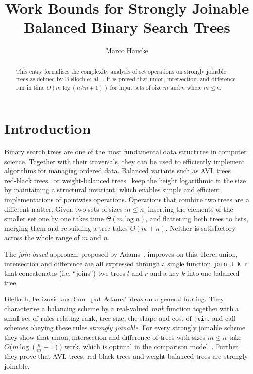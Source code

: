 \documentclass[11pt,a4paper]{article}
\begin{document}
\title{Work Bounds for Strongly Joinable Balanced Binary Search Trees}
\author{Marco Haucke}
\maketitle

\begin{abstract}
  This entry formalises the complexity analysis of set operations on strongly
  joinable trees as defined by Blelloch et al.~\cite{blelloch2022joinable}.
  It is proved that union, intersection, and difference run in time
  $O(m \log(n/m + 1))$ for input sets of size $m$ and $n$ where $m \le n$.
\end{abstract}

\tableofcontents

\section{Introduction}

Binary search trees are one of the most fundamental data structures in
computer science. Together with their traversals, they can be used to
efficiently implement algorithms for managing ordered data. Balanced
variants such as AVL trees~\cite{adelsonvelskii1962algorithm}, red-black
trees~\cite{guibas1978dichromatic} or weight-balanced
trees~\cite{nievergelt1973bounded} keep the
height logarithmic in the size by maintaining a structural invariant, which
enables simple and efficient implementations of pointwise operations.
Operations that combine two trees are a different matter. Given two sets of
sizes $m \le n$, inserting the elements of the smaller set one by one takes
time $\Theta(m \log n)$, and flattening both trees to lists, merging them and
rebuilding a tree takes $O(m + n)$. Neither is satisfactory across the whole
range of $m$ and $n$.

The \emph{join-based} approach, proposed by Adams~\cite{adams1993efficient},
improves on this.
Here, union, intersection and difference are all expressed through a
single function \texttt{join l k r} that concatenates (i.e. ``joins'') two trees 
$l$ and $r$ and a key $k$ into one balanced tree.

Blelloch, Ferizovic and Sun~\cite{blelloch2022joinable} put Adams' ideas on a
general footing. They characterise a balancing scheme by a real-valued
\emph{rank} function together with a small set of rules relating rank, tree
size, the shape and cost of \texttt{join}, and call
schemes obeying these rules \emph{strongly joinable}. For every strongly
joinable scheme they show that union, intersection and difference of trees
with sizes $m \le n$ take $O\bigl(m \log(\frac{n}{m} + 1)\bigr)$ work, which
is optimal in the comparison model~\cite{hwang1972merging}. 
Further, they prove that AVL trees, red-black trees and weight-balanced trees 
are strongly joinable. 
\end{document}

